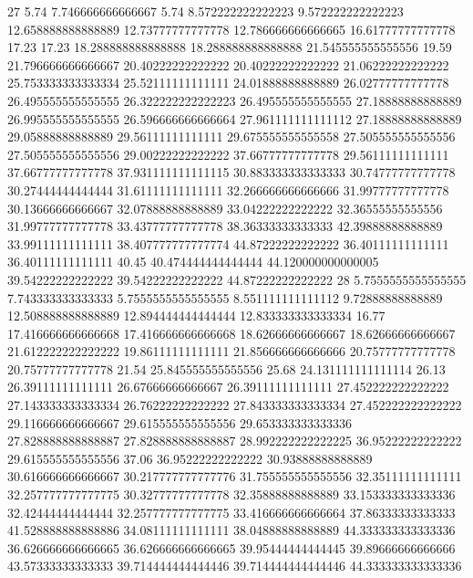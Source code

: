 27 5.74 7.746666666666667 5.74 8.572222222222223 9.572222222222223 12.658888888888889 12.73777777777778 12.786666666666665 16.61777777777778 17.23 17.23 18.288888888888888 18.288888888888888 21.545555555555556 19.59 21.796666666666667 20.40222222222222 20.40222222222222 21.06222222222222 25.753333333333334 25.52111111111111 24.01888888888889 26.02777777777778 26.495555555555555 26.322222222222223 26.495555555555555 27.18888888888889 26.995555555555555 26.596666666666664 27.961111111111112 27.18888888888889 29.05888888888889 29.56111111111111 29.675555555555558 27.505555555555556 27.505555555555556 29.00222222222222 37.66777777777778 29.56111111111111 37.66777777777778 37.931111111111115 30.883333333333333 30.74777777777778 30.27444444444444 31.61111111111111 32.266666666666666 31.99777777777778 30.13666666666667 32.07888888888889 33.04222222222222 32.36555555555556 31.99777777777778 33.43777777777778 38.36333333333333 42.39888888888889 33.99111111111111 38.407777777777774 44.87222222222222 36.40111111111111 36.40111111111111 40.45 40.474444444444444 44.120000000000005 39.54222222222222 39.54222222222222 44.87222222222222
28 5.7555555555555555 7.743333333333333 5.7555555555555555 8.551111111111112 9.72888888888889 12.508888888888889 12.894444444444444 12.833333333333334 16.77 17.416666666666668 17.416666666666668 18.62666666666667 18.62666666666667 21.612222222222222 19.86111111111111 21.856666666666666 20.75777777777778 20.75777777777778 21.54 25.845555555555556 25.68 24.131111111111114 26.13 26.39111111111111 26.67666666666667 26.39111111111111 27.452222222222222 27.143333333333334 26.76222222222222 27.843333333333334 27.452222222222222 29.116666666666667 29.615555555555556 29.653333333333336 27.828888888888887 27.828888888888887 28.992222222222225 36.95222222222222 29.615555555555556 37.06 36.95222222222222 30.93888888888889 30.616666666666667 30.217777777777776 31.755555555555556 32.35111111111111 32.257777777777775 30.32777777777778 32.35888888888889 33.153333333333336 32.42444444444444 32.257777777777775 33.416666666666664 37.86333333333333 41.528888888888886 34.08111111111111 38.04888888888889 44.333333333333336 36.626666666666665 36.626666666666665 39.95444444444445 39.89666666666666 43.57333333333333 39.714444444444446 39.714444444444446 44.333333333333336
